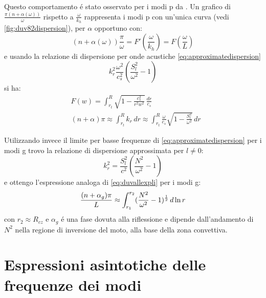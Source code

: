 \documentclass[../main.tex]{subfiles}
\begin{document}
Questo comportamento \'e stato osservato per i modi p da \citet{duv82dispersion}. Un grafico di $\frac{\pi(n+\alpha(\omega))}{\omega}$ rispetto a $\frac{\omega}{k_h}$ rappresenta i modi p con un'unica curva (vedi \ref{fig:duv82dispersion}), per $\alpha$ opportuno con:
\begin{equation}
(n+\alpha(\omega))\frac{\pi}{\omega}=F'(\frac{\omega}{k_h})=F(\frac{\omega}{L})\label{eq:duvallr}
\end{equation}
e usando la relazione di dispersione per onde acustiche \eqref{eq:approximatedispersion}
\begin{equation}
k_r^2\frac{\omega^2}{c_s^2}(\frac{S_l^2}{\omega^2}-1)
\end{equation}
si ha:
\begin{align}
&F(w)=\int_{r_t}^R\sqrt{1-\frac{c_s^2}{r^2w^2}}\,\frac{dr}{c_s}\label{eq:duvallf}\\
&(n+\alpha)\pi\approx\int_{r_t}^Rk_r\,dr\approx\int_{r_t}^R\frac{\omega}{c_s}\sqrt{1-\frac{S_l^2}{\omega^2}}\,dr\label{eq:duvallexpli}
\end{align}

Utilizzando invece il limite per basse frequenze di \eqref{eq:approximatedispersion} per i modi g trovo la relazione di dispersione approssimata per $l\neq0$:
\begin{equation}
k_r^2=\frac{S_l^2}{c^2}(\frac{N^2}{\omega^2}-1)\label{eq:dispersionag}
\end{equation}
e ottengo l'espressione analoga di \eqref{eq:duvallexpli} per i modi g:
\begin{equation}\label{eq:duvallg}
\frac{(n+\alpha_g)\pi}{L}\approx\int_{r_1}^{r_2}(\frac{N^2}{\omega^2}-1)^{\frac{1}{2}}\,d\ln{r}
\end{equation}
con $r_2\approx R_{cz}$ e $\alpha_g$ \'e una fase dovuta alla riflessione e dipende dall'andamento di $N^2$ nella regione di inversione del moto, alla base della zona convettiva.

\section{Espressioni asintotiche delle frequenze dei modi}

\end{document}
